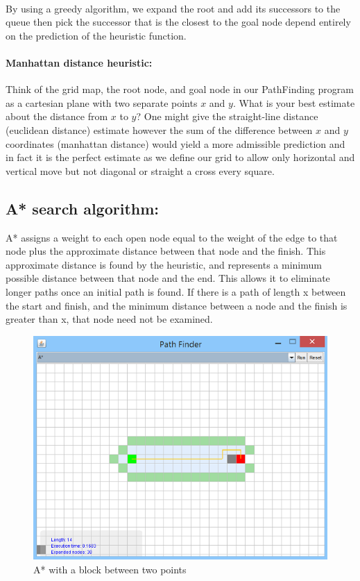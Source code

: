 \documentclass[a4paper]{article}
\begin{document}
\noindent \\
By using a greedy algorithm, we expand the root and add its successors to the queue then pick the successor that is the closest to the goal node depend entirely on the prediction of the heuristic function.

\paragraph{Manhattan distance heuristic: } Think of the grid map, the root node, and goal node in our PathFinding program as a cartesian plane with two separate points $x$ and $y$. What is your best estimate about the distance from $x$ to $y$? One might give the straight-line distance (euclidean distance) estimate however the sum of the difference between $x$ and $y$ coordinates (manhattan distance) would yield a more admissible prediction and in fact it is the perfect estimate as we define our grid to allow only horizontal and vertical move but not diagonal or straight a cross every square.  


\subsection{A* search algorithm:}

A* assigns a weight to each open node equal to the weight of the edge to that node plus the approximate distance between that node and the finish. This approximate distance is found by the heuristic, and represents a minimum possible distance between that node and the end. This allows it to eliminate longer paths once an initial path is found. If there is a path of length x between the start and finish, and the minimum distance between a node and the finish is greater than x, that node need not be examined. \\

\begin{figure}[h!]
  \centering
    \includegraphics[scale=.9]{images/A1.png}
  \caption{A* with a block between two points}
\end{figure}
\end{document}
